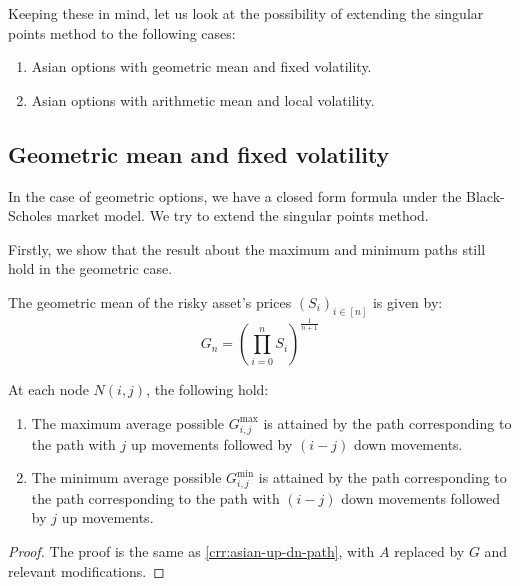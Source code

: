 Keeping these in mind, let us look at the possibility of extending the singular points method to the following cases:
\begin{enumerate}
\item Asian options with geometric mean and fixed volatility.
\item Asian options with arithmetic mean and local volatility.
\end{enumerate}



\subsection{Geometric mean and fixed volatility}
\label{subsec:gm-fixed-vol}

In the case of geometric options, we have a closed form formula under the Black-Scholes market model. We try to extend the singular points method.

Firstly, we show that the result about the maximum and minimum paths still hold in the geometric case.

\begin{dfn}
	The geometric mean of the risky asset's prices $ (S_i)_{i \in [n]} $ is given by:
	\begin{equation}
		\label{eq:gm}
		G_{n} = \left( \prod_{i=0}^n S_i \right) ^{\frac{1}{n+1}}
	\end{equation}
\end{dfn}


\begin{lmm}
	At each node $N(i,j)$, the following hold:
	\begin{enumerate}
	\item The maximum average possible $ G_{i,j}^{\max} $ is attained by the path corresponding to the path with $j$ up movements followed by $(i-j)$ down movements.
	\item The minimum average possible $ G_{i,j}^{\min} $ is attained by the path corresponding to the path corresponding to the path with $(i-j)$ down movements followed by $j$ up movements.
	\end{enumerate}
\end{lmm}

\begin{proof}
	The proof is the same as \ref{crr:asian-up-dn-path}, with $A$ replaced by $G$ and relevant modifications.
\end{proof}


